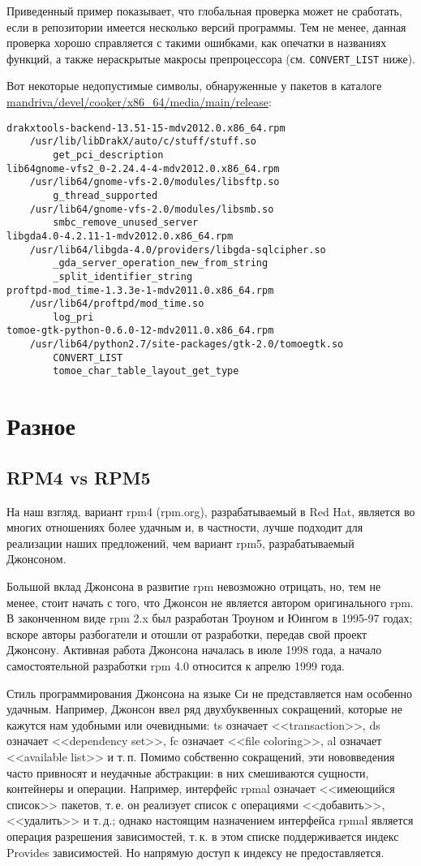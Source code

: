\documentclass[russian,a4paper,12pt,titlepage]{article}
\begin{document}
Приведенный пример показывает, что глобальная проверка может не сработать, если в репозитории имеется несколько версий
программы.  Тем не менее, данная проверка хорошо справляется с такими ошибками, как опечатки в названиях функций,
а также нераскрытые макросы препроцессора (см. \verb|CONVERT_LIST| ниже).

Вот некоторые недопустимые символы, обнаруженные у пакетов в каталоге
\url{mandriva/devel/cooker/x86_64/media/main/release}:
\begin{verbatim}
drakxtools-backend-13.51-15-mdv2012.0.x86_64.rpm
    /usr/lib/libDrakX/auto/c/stuff/stuff.so
        get_pci_description
lib64gnome-vfs2_0-2.24.4-4-mdv2012.0.x86_64.rpm
    /usr/lib64/gnome-vfs-2.0/modules/libsftp.so
        g_thread_supported
    /usr/lib64/gnome-vfs-2.0/modules/libsmb.so
        smbc_remove_unused_server
libgda4.0-4.2.11-1-mdv2012.0.x86_64.rpm
    /usr/lib64/libgda-4.0/providers/libgda-sqlcipher.so
        _gda_server_operation_new_from_string
        _split_identifier_string
proftpd-mod_time-1.3.3e-1-mdv2011.0.x86_64.rpm
    /usr/lib64/proftpd/mod_time.so
        log_pri
tomoe-gtk-python-0.6.0-12-mdv2011.0.x86_64.rpm
    /usr/lib64/python2.7/site-packages/gtk-2.0/tomoegtk.so
        CONVERT_LIST
        tomoe_char_table_layout_get_type
\end{verbatim}

\section{Разное}

\subsection{RPM4 vs RPM5}
На наш взгляд, вариант rpm4 (rpm.org), разрабатываемый в Red Hat, является во многих отношениях более удачным и, в частности,
лучше подходит для реализации наших предложений, чем вариант rpm5, разрабатываемый Джонсоном.

Большой вклад Джонсона в развитие rpm невозможно отрицать, но, тем не менее, стоит начать с того, что Джонсон
не является автором оригинального rpm.  В законченном виде rpm 2.x был разработан Троуном и Юингом в 1995-97 годах;
вскоре авторы разбогатели и отошли от разработки, передав свой проект Джонсону.  Активная работа Джонсона началась
в июле 1998 года, а начало самостоятельной разработки rpm 4.0 относится к апрелю 1999 года.

Стиль программирования Джонсона на языке Си не представляется нам особенно удачным.  Например, Джонсон ввел ряд
двухбуквенных сокращений, которые не кажутся нам удобными или очевидными: ts означает <<transaction>>, ds означает <<dependency set>>,
fc означает <<file coloring>>, al означает <<available list>> и т.\,п.  Помимо собственно сокращений, эти нововведения часто
привносят и неудачные абстракции: в них смешиваются сущности, контейнеры и операции.  Например, интерфейс rpmal означает
<<имеющийся список>> пакетов, т.\,е. он реализует список с операциями <<добавить>>, <<удалить>> и т.\,д.; однако настоящим назначением
интерфейса rpmal является операция разрешения зависимостей, т.\,к. в этом списке поддерживается индекс Provides зависимостей.
Но напрямую доступ к индексу не предоставляется.
\end{document}
